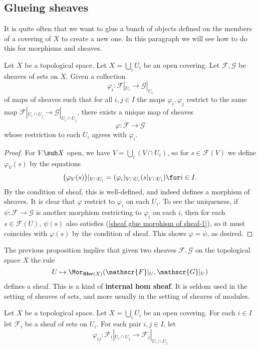 \subsection{Glueing sheaves}
It is quite often that we want to glue a bunch of objects defined on the members of a covering of $X$ to create a new one. In this paragraph we will see how to do this for morphisms and sheaves.
\begin{proposition}\label{sheaf glue morphism of sheaf}
Let $X$ be a topological space. Let $X=\bigcup_iU_i$ be an open covering. Let $\mathscr{F},\mathscr{G}$ be sheaves of sets on $X$. Given a collection
\[\varphi_i:\mathscr{F}|_{U_i}\to\mathscr{G}|_{U_i}\]
of maps of sheaves such that for all $i,j\in I$ the maps $\varphi_i,\varphi_j$ restrict to the same map $\mathscr{F}|_{U_i\cap U_j}\to\mathscr{G}|_{U_i\cap U_j}$, there exists a unique map of sheaves
\[\varphi:\mathscr{F}\to\mathscr{G}\]
whose restriction to each $U_i$ agrees with $\varphi_i$.
\end{proposition}
\begin{proof}
For $V\sub X$ open, we have $V=\bigcup_i(V\cap U_i)$, so for $s\in\mathscr{F}(V)$ we define $\varphi_V(s)$ by the equations
\begin{align}\label{sheaf glue morphism of sheaf-1}
\big(\varphi_V(s)\big)|_{V\cap U_i}=(\varphi_{i})_{V\cap U_i}(s|_{V\cap U_i})\for i\in I.
\end{align}
By the condition of sheaf, this is well-defined, and indeed defines a morphism of sheaves. It is clear that $\varphi$ restrict to $\varphi_i$ on each $U_i$. To see the uniqueness, if $\psi:\mathscr{F}\to\mathscr{G}$ is another morphism restricting to $\varphi_i$ on each $i$, then for each $s\in\mathscr{F}(U)$, $\psi(s)$ also satisfies (\ref{sheaf glue morphism of sheaf-1}), so it must coincides with $\varphi(s)$ by the condition of sheaf. This shows $\varphi=\psi$, as desired.
\end{proof}
The previous proposition implies that given two sheaves $\mathscr{F},\mathscr{G}$ on the topological space $X$ the rule
\[U\mapsto\Mor_{\mathbf{Shv}(X)}(\mathscr{F}|_U,\mathscr{G}|_U)\]
defines a sheaf. This is a kind of \textbf{internal hom sheaf}. It is seldom used in the setting of sheaves of sets, and more usually in the setting of sheaves of modules.\par
Let $X$ be a topological space. Let $X=\bigcup_iU_i$ be an open covering. For each $i\in I$ let $\mathscr{F}_i$ be a sheaf of sets on $U_i$. For each pair $i,j\in I$, let 
\[\varphi_{ij}:\mathscr{F}_i|_{U_i\cap U_j}\to\mathscr{F}_j|_{U_i\cap U_j}\]
